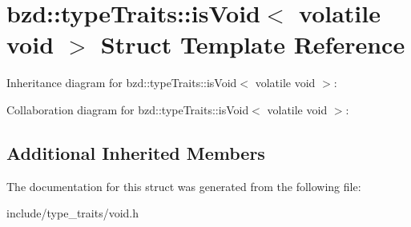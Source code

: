 \hypertarget{structbzd_1_1typeTraits_1_1isVoid_3_01volatile_01void_01_4}{}\section{bzd\+:\+:type\+Traits\+:\+:is\+Void$<$ volatile void $>$ Struct Template Reference}
\label{structbzd_1_1typeTraits_1_1isVoid_3_01volatile_01void_01_4}


Inheritance diagram for bzd\+:\+:type\+Traits\+:\+:is\+Void$<$ volatile void $>$\+:


Collaboration diagram for bzd\+:\+:type\+Traits\+:\+:is\+Void$<$ volatile void $>$\+:
\subsection*{Additional Inherited Members}


The documentation for this struct was generated from the following file\+:\begin{DoxyCompactItemize}
\item 
include/type\+\_\+traits/void.\+h\end{DoxyCompactItemize}
